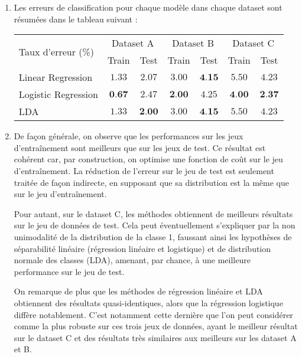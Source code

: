 \documentclass{article}
\begin{document}
\begin{enumerate}[label=(\alph*)]
\item Les erreurs de classification pour chaque modèle dans chaque dataset sont résumées dans le tableau suivant :
\begin{center}
\begin{tabular}{|l|c|c|c|c|c|c|}
\hline
\multirow{2}{*}{Taux d'erreur (\%)} & \multicolumn{2}{c|}{Dataset A} & \multicolumn{2}{c|}{Dataset B} & \multicolumn{2}{c|}{Dataset C}\\
& Train & Test & Train & Test & Train & Test\\
\hline
Linear Regression & $1.33$ & $2.07$ & $3.00$ & $\textbf{4.15}$ & $5.50$ & $4.23$\\
\hline
Logistic Regression & $\textbf{0.67}$ & $2.47$ & $\textbf{2.00}$ & $4.25$ & $\textbf{4.00}$ & $\textbf{2.37}$\\
\hline
LDA & $1.33$ & $\textbf{2.00}$ & $3.00$ & $\textbf{4.15}$ & $5.50$ & $4.23$\\
\hline
\end{tabular}
\end{center}

\item De façon générale, on observe que les performances sur les jeux d'entraînement sont meilleurs que sur les jeux de test. Ce résultat est cohérent car, par construction, on optimise une fonction de coût sur le jeu d'entraînement. La réduction de l'erreur sur le jeu de test est seulement traitée de façon indirecte, en supposant que sa distribution est la même que sur le jeu d'entraînement.

Pour autant, sur le dataset C, les méthodes obtiennent de meilleurs résultats sur le jeu de données de test. Cela peut éventuellement s'expliquer par la non unimodalité de la distribution de la classe 1, faussant ainsi les hypothèses de séparabilité linéaire (régression linéaire et logistique) et de distribution normale des classes (LDA), amenant, par chance, à une meilleure performance sur le jeu de test.

On remarque de plus que les méthodes de régression linéaire et LDA obtiennent des résultats quasi-identiques, alors que la régression logistique diffère notablement. C'est notamment cette dernière que l'on peut considérer comme la plus robuste sur ces trois jeux de données, ayant le meilleur résultat sur le dataset C et des résultats très similaires aux meilleurs sur les dataset A et B.


\end{enumerate}
\end{document}
